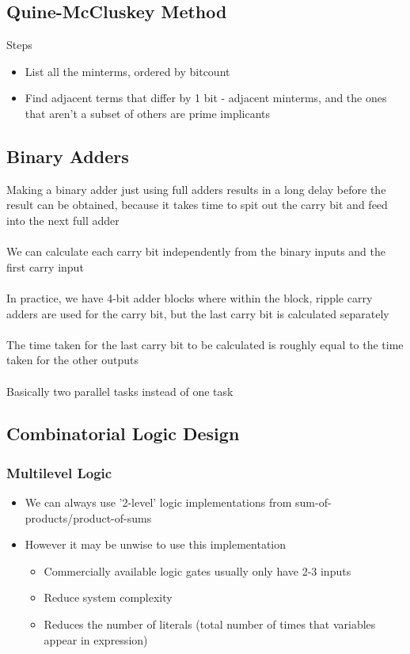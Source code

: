 \documentclass[12pt,a4paper]{article} %
\begin{document}
\subsection{Quine-McCluskey Method}
Steps
\begin{itemize}
\item List all the minterms, ordered by bitcount
\item Find adjacent terms that differ by 1 bit - adjacent minterms, and the ones that aren't a subset of others are prime implicants
\end{itemize}
\subsection{Binary Adders}
Making a binary adder just using full adders results in a long delay before the result can be obtained, because it takes time to spit out the carry bit and feed into the next full adder
\\\\
We can calculate each carry bit independently from the binary inputs and the first carry input
\\\\
In practice, we have 4-bit adder blocks where within the block, ripple carry adders are used for the carry bit, but the last carry bit is calculated separately
\\\\
The time taken for the last carry bit to be calculated is roughly equal to the time taken for the other outputs
\\\\
Basically two parallel tasks instead of one task
\subsection{Combinatorial Logic Design}
\subsubsection{Multilevel Logic}
\begin{itemize}
\item We can always use '2-level' logic implementations from sum-of-products/product-of-sums
\item However it may be unwise to use this implementation
	\begin{itemize}
	\item Commercially available logic gates usually only have 2-3 inputs
	\item Reduce system complexity
	\item Reduces the number of literals (total number of times that variables appear in expression)	
	\end{itemize}
\end{itemize}
\end{document}
